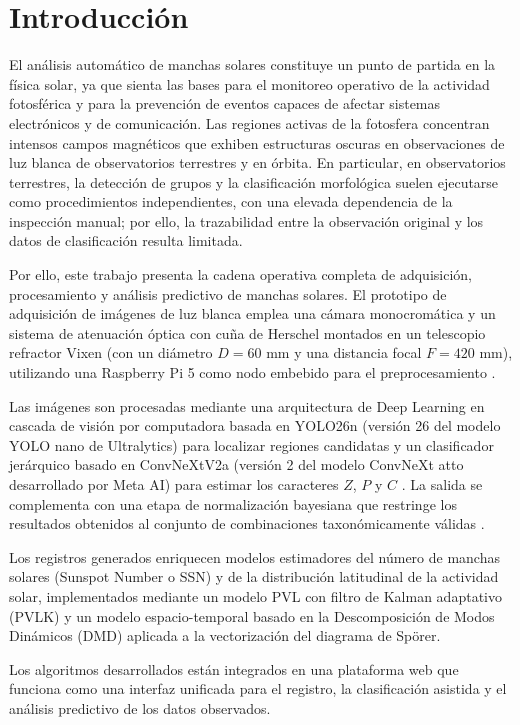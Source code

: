 \section{Introducción}

El análisis automático de manchas solares constituye un punto de partida en la física solar, ya que sienta las bases para el monitoreo operativo de la actividad fotosférica y para la prevención de eventos capaces de afectar sistemas electrónicos y de comunicación. Las regiones activas de la fotosfera concentran intensos campos magnéticos que exhiben estructuras oscuras en observaciones de luz blanca de observatorios terrestres y en órbita. En particular, en observatorios terrestres, la detección de grupos y la clasificación morfológica suelen ejecutarse como procedimientos independientes, con una elevada dependencia de la inspección manual; por ello, la trazabilidad entre la observación original y los datos de clasificación resulta limitada.

Por ello, este trabajo presenta la cadena operativa completa de adquisición, procesamiento y análisis predictivo de manchas solares. El prototipo de adquisición de imágenes de luz blanca emplea una cámara monocromática y un sistema de atenuación óptica con cuña de Herschel montados en un telescopio refractor Vixen (con un diámetro $D = 60$ mm y una distancia focal $F = 420$ mm), utilizando una Raspberry Pi 5 como nodo embebido para el preprocesamiento \citep{zwoASI174Manual2025, luntWhiteLightWedges2026, raspberryPi5Docs2026}.

Las imágenes son procesadas mediante una arquitectura de Deep Learning en cascada de visión por computadora basada en YOLO26n (versión 26 del modelo YOLO nano de Ultralytics) para localizar regiones candidatas y un clasificador jerárquico basado en ConvNeXtV2a (versión 2 del modelo ConvNeXt atto desarrollado por Meta AI) para estimar los caracteres $Z$, $P$ y $C$ \citep{ultralyticsYOLO26, woo2023convnextv2}. La salida se complementa con una etapa de normalización bayesiana que restringe los resultados obtenidos al conjunto de combinaciones taxonómicamente válidas \citep{mcintosh1990classification}.

Los registros generados enriquecen modelos estimadores del número de manchas solares (Sunspot Number o SSN) y de la distribución latitudinal de la actividad solar, implementados mediante un modelo PVL con filtro de Kalman adaptativo (PVLK) y un modelo espacio-temporal basado en la Descomposición de Modos Dinámicos (DMD) aplicada a la vectorización del diagrama de Spörer.

Los algoritmos desarrollados están integrados en una plataforma web que funciona como una interfaz unificada para el registro, la clasificación asistida y el análisis predictivo de los datos observados.